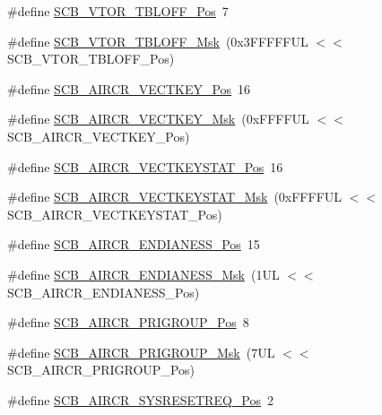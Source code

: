 \begin{DoxyCompactItemize}
\item 
\#define \hyperlink{group__CMSIS__SCB_gac6a55451ddd38bffcff5a211d29cea78}{S\-C\-B\-\_\-\-V\-T\-O\-R\-\_\-\-T\-B\-L\-O\-F\-F\-\_\-\-Pos}~7
\item 
\#define \hyperlink{group__CMSIS__SCB_ga75e395ed74042923e8c93edf50f0996c}{S\-C\-B\-\_\-\-V\-T\-O\-R\-\_\-\-T\-B\-L\-O\-F\-F\-\_\-\-Msk}~(0x3\-F\-F\-F\-F\-F\-U\-L $<$$<$ S\-C\-B\-\_\-\-V\-T\-O\-R\-\_\-\-T\-B\-L\-O\-F\-F\-\_\-\-Pos)
\item 
\#define \hyperlink{group__CMSIS__SCB_gaaa27c0ba600bf82c3da08c748845b640}{S\-C\-B\-\_\-\-A\-I\-R\-C\-R\-\_\-\-V\-E\-C\-T\-K\-E\-Y\-\_\-\-Pos}~16
\item 
\#define \hyperlink{group__CMSIS__SCB_ga90c7cf0c490e7ae55f9503a7fda1dd22}{S\-C\-B\-\_\-\-A\-I\-R\-C\-R\-\_\-\-V\-E\-C\-T\-K\-E\-Y\-\_\-\-Msk}~(0x\-F\-F\-F\-F\-U\-L $<$$<$ S\-C\-B\-\_\-\-A\-I\-R\-C\-R\-\_\-\-V\-E\-C\-T\-K\-E\-Y\-\_\-\-Pos)
\item 
\#define \hyperlink{group__CMSIS__SCB_gaec404750ff5ca07f499a3c06b62051ef}{S\-C\-B\-\_\-\-A\-I\-R\-C\-R\-\_\-\-V\-E\-C\-T\-K\-E\-Y\-S\-T\-A\-T\-\_\-\-Pos}~16
\item 
\#define \hyperlink{group__CMSIS__SCB_gabacedaefeefc73d666bbe59ece904493}{S\-C\-B\-\_\-\-A\-I\-R\-C\-R\-\_\-\-V\-E\-C\-T\-K\-E\-Y\-S\-T\-A\-T\-\_\-\-Msk}~(0x\-F\-F\-F\-F\-U\-L $<$$<$ S\-C\-B\-\_\-\-A\-I\-R\-C\-R\-\_\-\-V\-E\-C\-T\-K\-E\-Y\-S\-T\-A\-T\-\_\-\-Pos)
\item 
\#define \hyperlink{group__CMSIS__SCB_gad31dec98fbc0d33ace63cb1f1a927923}{S\-C\-B\-\_\-\-A\-I\-R\-C\-R\-\_\-\-E\-N\-D\-I\-A\-N\-E\-S\-S\-\_\-\-Pos}~15
\item 
\#define \hyperlink{group__CMSIS__SCB_ga2f571f93d3d4a6eac9a3040756d3d951}{S\-C\-B\-\_\-\-A\-I\-R\-C\-R\-\_\-\-E\-N\-D\-I\-A\-N\-E\-S\-S\-\_\-\-Msk}~(1\-U\-L $<$$<$ S\-C\-B\-\_\-\-A\-I\-R\-C\-R\-\_\-\-E\-N\-D\-I\-A\-N\-E\-S\-S\-\_\-\-Pos)
\item 
\#define \hyperlink{group__CMSIS__SCB_gaca155deccdeca0f2c76b8100d24196c8}{S\-C\-B\-\_\-\-A\-I\-R\-C\-R\-\_\-\-P\-R\-I\-G\-R\-O\-U\-P\-\_\-\-Pos}~8
\item 
\#define \hyperlink{group__CMSIS__SCB_ga8be60fff03f48d0d345868060dc6dae7}{S\-C\-B\-\_\-\-A\-I\-R\-C\-R\-\_\-\-P\-R\-I\-G\-R\-O\-U\-P\-\_\-\-Msk}~(7\-U\-L $<$$<$ S\-C\-B\-\_\-\-A\-I\-R\-C\-R\-\_\-\-P\-R\-I\-G\-R\-O\-U\-P\-\_\-\-Pos)
\item 
\#define \hyperlink{group__CMSIS__SCB_gaffb2737eca1eac0fc1c282a76a40953c}{S\-C\-B\-\_\-\-A\-I\-R\-C\-R\-\_\-\-S\-Y\-S\-R\-E\-S\-E\-T\-R\-E\-Q\-\_\-\-Pos}~2
$$
\end{DoxyCompactItemize}
